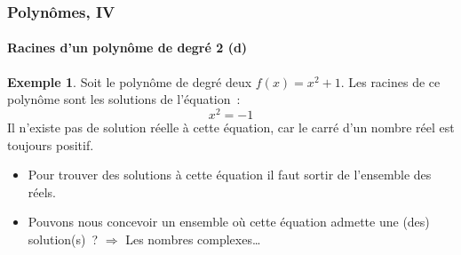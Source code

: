 \documentclass[10pt,notheorems]{beamer}
\theoremstyle{plain}
\theoremstyle{definition} %
\newtheorem{example}{Exemple}
\begin{document}
\begin{frame}
  \frametitle{Polynômes, IV}
  \framesubtitle{Racines d'un polynôme de degré 2 (d)}
  \hypertarget{slide_polynome_2_racines_4}{}

  \bigskip

  \begin{example}
    Soit le polynôme de degré deux $f(x) = x^2+1$. Les racines de ce
    polynôme sont les solutions de l'équation~:
    \[
      x^2 = -1
    \]
    Il n'existe pas de solution réelle à cette équation, car le carré
    d'un nombre réel est toujours positif.
  \end{example}

  \bigskip

  \begin{itemize}

  \item Pour trouver des solutions à cette équation il faut sortir de l'ensemble des réels.\newline

  \item Pouvons nous concevoir un ensemble où cette équation admette une (des) solution(s)~? $\Rightarrow$ Les nombres complexes\ldots

  \end{itemize}

\end{frame}
\end{document}
